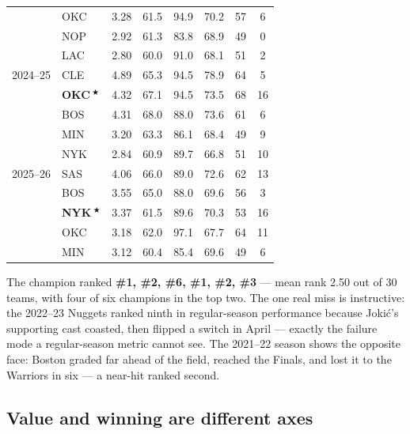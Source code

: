 \documentclass[11pt]{article}
\newcommand{\champ}[1]{\textbf{#1}\,$^{\bigstar}$}
\begin{document}
\begin{table}[h]
\begin{tabular}{clcccccc}
         & OKC         & 3.28 & 61.5 & 94.9 & 70.2 & 57 & 6  \\
         & NOP         & 2.92 & 61.3 & 83.8 & 68.9 & 49 & 0  \\
         & LAC         & 2.80 & 60.0 & 91.0 & 68.1 & 51 & 2  \\
\midrule
2024--25 & CLE         & 4.89 & 65.3 & 94.5 & 78.9 & 64 & 5  \\
         & \champ{OKC} & 4.32 & 67.1 & 94.5 & 73.5 & 68 & 16 \\
         & BOS         & 4.31 & 68.0 & 88.0 & 73.6 & 61 & 6  \\
         & MIN         & 3.20 & 63.3 & 86.1 & 68.4 & 49 & 9  \\
         & NYK         & 2.84 & 60.9 & 89.7 & 66.8 & 51 & 10 \\
\midrule
2025--26 & SAS         & 4.06 & 66.0 & 89.0 & 72.6 & 62 & 13 \\
         & BOS         & 3.55 & 65.0 & 88.0 & 69.6 & 56 & 3  \\
         & \champ{NYK} & 3.37 & 61.5 & 89.6 & 70.3 & 53 & 16 \\
         & OKC         & 3.18 & 62.0 & 97.1 & 67.7 & 64 & 11 \\
         & MIN         & 3.12 & 60.4 & 85.4 & 69.6 & 49 & 6  \\
\bottomrule
\end{tabular}
\end{table}

The champion ranked \textbf{\#1, \#2, \#6, \#1, \#2, \#3} --- mean rank 2.50
out of 30 teams, with four of six champions in the top two. The one real miss
is instructive: the 2022--23 Nuggets ranked ninth in regular-season
performance because Joki\'c's supporting cast coasted, then flipped a switch
in April --- exactly the failure mode a regular-season metric cannot see. The
2021--22 season shows the opposite face: Boston graded far ahead of the field,
reached the Finals, and lost it to the Warriors in six --- a near-hit ranked
second.

\subsection{Value and winning are different axes}
\end{document}
